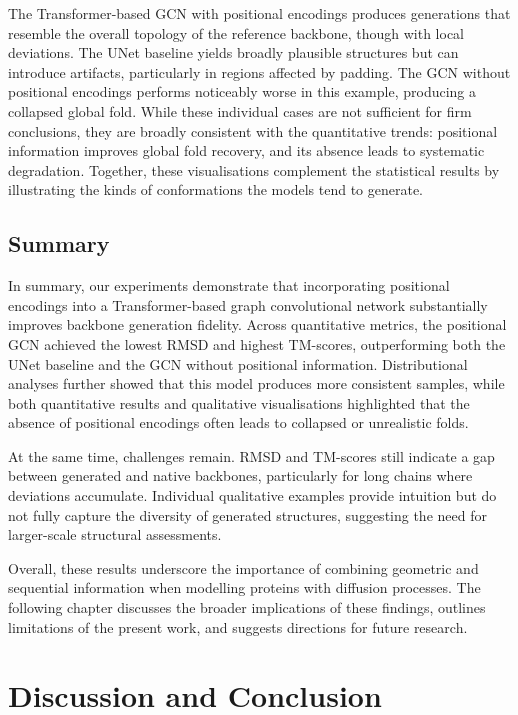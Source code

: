 \documentclass[a4paper,12pt]{article}
\begin{document}
The Transformer-based GCN with positional encodings produces generations that resemble the overall topology of the reference backbone, though with local deviations. The UNet baseline yields broadly plausible structures but can introduce artifacts, particularly in regions affected by padding. The GCN without positional encodings performs noticeably worse in this example, producing a collapsed global fold. While these individual cases are not sufficient for firm conclusions, they are broadly consistent with the quantitative trends: positional information improves global fold recovery, and its absence leads to systematic degradation. Together, these visualisations complement the statistical results by illustrating the kinds of conformations the models tend to generate.

\subsection{Summary}\label{subsec:experiments-summary}
In summary, our experiments demonstrate that incorporating positional encodings into a Transformer-based graph convolutional network substantially improves backbone generation fidelity. Across quantitative metrics, the positional GCN achieved the lowest RMSD and highest TM-scores, outperforming both the UNet baseline and the GCN without positional information. Distributional analyses further showed that this model produces more consistent samples, while both quantitative results and qualitative visualisations highlighted that the absence of positional encodings often leads to collapsed or unrealistic folds.

At the same time, challenges remain. RMSD and TM-scores still indicate a gap between generated and native backbones, particularly for long chains where deviations accumulate. Individual qualitative examples provide intuition but do not fully capture the diversity of generated structures, suggesting the need for larger-scale structural assessments.

Overall, these results underscore the importance of combining geometric and sequential information when modelling proteins with diffusion processes. The following chapter discusses the broader implications of these findings, outlines limitations of the present work, and suggests directions for future research.

\clearpage

\section{Discussion and Conclusion}\label{sec:Discussion_and_Conclusion}
\end{document}
